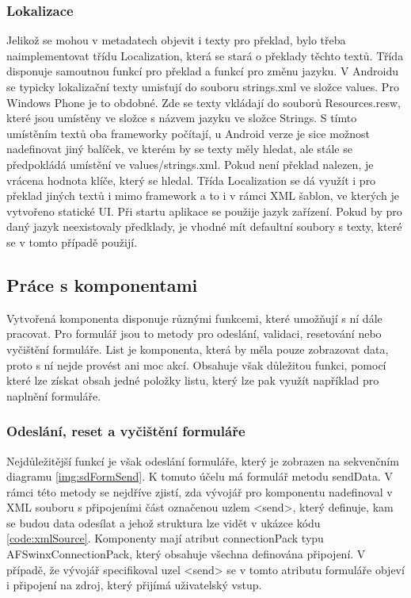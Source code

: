 \subsubsection{Lokalizace}
Jelikož se mohou v metadatech objevit i texty pro překlad, bylo třeba naimplementovat třídu Localization, která se stará o překlady těchto textů. Třída disponuje samoutnou funkcí pro překlad a funkcí pro změnu jazyku. V Androidu se typicky lokalizační texty umisťují do souboru strings.xml ve složce values. Pro Windows Phone je to obdobné. Zde se texty vkládají do souborů Resources.resw, které jsou umístěny ve složce s názvem jazyku ve složce Strings. S tímto umístěním textů oba frameworky počítají, u Android verze je sice možnost nadefinovat jiný balíček, ve kterém by se texty měly hledat, ale stále se předpokládá umístění ve values/strings.xml. Pokud není překlad nalezen, je vrácena hodnota klíče, který se hledal. Třída Localization se dá využít i pro překlad jiných textů i mimo framework a to i v rámci XML šablon, ve kterých je vytvořeno statické UI. Při startu aplikace se použije jazyk zařízení. Pokud by pro daný jazyk neexistovaly předklady, je vhodné mít defaultní soubory s texty, které se v tomto případě použijí.

\subsection{Práce s komponentami}
Vytvořená komponenta disponuje různými funkcemi, které umožňují s ní dále pracovat. Pro formulář jsou to metody pro odeslání, validaci, resetování nebo vyčištění formuláře. List je komponenta, která by měla pouze zobrazovat data, proto s ní nejde provést ani moc akcí. Obsahuje však důležitou funkci, pomocí které lze získat obsah jedné položky listu, který lze pak využít například pro naplnění formuláře. 

\subsubsection{Odeslání, reset a vyčištění formuláře}
Nejdůležitější funkcí je však odeslání formuláře, který je zobrazen na sekvenčním diagramu \ref{img:sdFormSend}. K tomuto účelu má formulář metodu sendData. V rámci této metody se nejdříve zjistí, zda vývojář pro komponentu nadefinoval v XML souboru s připojeními část označenou uzlem <send>, který definuje, kam se budou data odesílat a jehož struktura lze vidět v ukázce kódu \ref{code:xmlSource}. Komponenty mají atribut connectionPack typu AFSwinxConnectionPack, který obsahuje všechna definována připojení. V případě, že vývojář specifikoval uzel <send> se v tomto atributu formuláře objeví i připojení na zdroj, který přijímá uživatelský vstup. 

